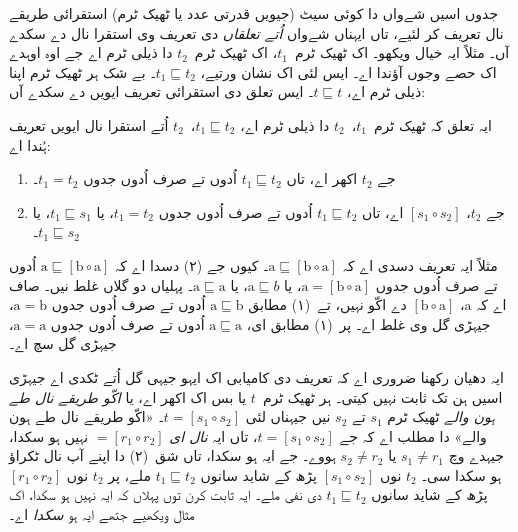 \documentclass[../../../include/open-logic-section]{subfiles}
\begin{document}


جدوں اسیں شےواں دا کوئی سیٹ (جیویں قدرتی عدد یا ٹھیک ٹرم) استقرائی طریقے نال تعریف کر لئیے، تاں ایہناں شےواں \emph{اُتے تعلقاں} دی تعریف وی استقرا نال دے سکدے آں۔ مثلاً ایہ خیال ویکھو۔ اک ٹھیک ٹرم~$t_1$، اک ٹھیک ٹرم~$t_2$ دا ذیلی ٹرم اے جے اوہ اوہدے اک حصے وجوں آؤندا اے۔ ایس لئی اک نشان ورتیے، $t_1 \sqsubseteq t_2$۔ بے شک ہر ٹھیک ٹرم اپنا ذیلی ٹرم اے، $t \sqsubseteq t$۔ ایس تعلق دی استقرائی تعریف ایویں دے سکدے آں:

\begin{defn}
  ایہ تعلق کہ ٹھیک ٹرم~$t_1$،~$t_2$ دا ذیلی ٹرم اے، $t_1
  \sqsubseteq t_2$،~$t_2$ اُتے استقرا نال ایویں تعریف ہُندا اے:
  \begin{enumerate}
  \item جے $t_2$ اکھر اے، تاں $t_1 \sqsubseteq t_2$ اُدوں تے صرف اُدوں جدوں $t_1 = t_2$۔
  \item جے $t_2$، $[s_1 \circ s_2]$ اے، تاں $t_1 \sqsubseteq t_2$ اُدوں تے صرف اُدوں جدوں $t_1 =
    t_2$، یا $t_1 \sqsubseteq s_1$، یا $t_1 \sqsubseteq s_2$۔
  \end{enumerate}
\end{defn}

مثلاً ایہ تعریف دسدی اے کہ $\mathrm{a}
\sqsubseteq [\mathrm{b} \circ \mathrm{a}]$۔ کیوں جے (۲) دسدا اے کہ
$\mathrm{a} \sqsubseteq [\mathrm{b} \circ \mathrm{a}]$ اُدوں تے صرف اُدوں جدوں $\mathrm{a}
= [\mathrm{b} \circ \mathrm{a}]$، یا $\mathrm{a} \sqsubseteq b$، یا
$\mathrm{a} \sqsubseteq \mathrm{a}$۔ پہلیاں دو گلاں غلط نیں۔ صاف اے کہ $\mathrm{a}$، $[\mathrm{b} \circ
  \mathrm{a}]$ دے اکّو نہیں، تے~(۱) مطابق $\mathrm{a} \sqsubseteq \mathrm{b}$ اُدوں تے صرف اُدوں جدوں $\mathrm{a} = \mathrm{b}$، جیہڑی گل وی غلط اے۔ پر~(۱) مطابق ای، $\mathrm{a} \sqsubseteq \mathrm{a}$ اُدوں تے صرف اُدوں جدوں $\mathrm{a} = \mathrm{a}$، جیہڑی گل سچ اے۔

ایہ دھیان رکھنا ضروری اے کہ تعریف دی کامیابی اک ایہو جیہی گل اُتے ٹکدی اے جیہڑی اسیں ہن تک ثابت نہیں کیتی۔ ہر ٹھیک ٹرم~$t$ یا بس اک اکھر اے، یا \emph{اکّو طریقے نال طے ہون والے} ٹھیک ٹرم $s_1$ تے $s_2$ نیں جیہناں لئی $t = [s_1 \circ s_2]$۔ «اکّو طریقے نال طے ہون والے» دا مطلب اے کہ جے $t = [s_1 \circ s_2]$، تاں ایہ \emph{نال ای} $= [r_1 \circ r_2]$ نہیں ہو سکدا، جیہدے وچ $s_1 \neq r_1$ یا $s_2 \neq r_2$ ہووے۔ جے ایہ ہو سکدا، تاں شق~(۲) دا اپنے آپ نال ٹکراؤ ہو سکدا سی۔ $t_2$ نوں $[s_1 \circ s_2]$ پڑھ کے شاید سانوں $t_1
\sqsubseteq t_2$ ملے، پر $t_2$ نوں $[r_1 \circ r_2]$ پڑھ کے شاید سانوں $t_1 \sqsubseteq t_2$ دی نفی ملے۔ ایہ ثابت کرن توں پہلاں کہ ایہ نہیں ہو سکدا، اک مثال ویکھیے جتھے ایہ ہو \emph{سکدا} اے۔
\end{document}
